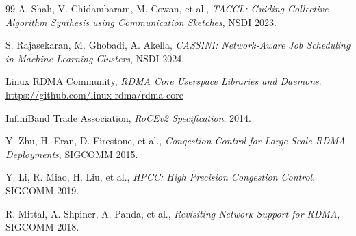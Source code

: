 \documentclass[10pt,letterpaper]{article}
\begin{document}
\begin{thebibliography}{99}
A. Shah, V. Chidambaram, M. Cowan, et al.,
\textit{TACCL: Guiding Collective Algorithm Synthesis using Communication Sketches}, NSDI 2023.

S. Rajasekaran, M. Ghobadi, A. Akella,
\textit{CASSINI: Network-Aware Job Scheduling in Machine Learning Clusters}, NSDI 2024.

Linux RDMA Community,
\textit{RDMA Core Userspace Libraries and Daemons}.
\url{https://github.com/linux-rdma/rdma-core}

InfiniBand Trade Association,
\textit{RoCEv2 Specification}, 2014.

Y. Zhu, H. Eran, D. Firestone, et al.,
\textit{Congestion Control for Large-Scale RDMA Deployments}, SIGCOMM 2015.

Y. Li, R. Miao, H. Liu, et al.,
\textit{HPCC: High Precision Congestion Control}, SIGCOMM 2019.

R. Mittal, A. Shpiner, A. Panda, et al.,
\textit{Revisiting Network Support for RDMA}, SIGCOMM 2018.

\end{thebibliography}
\end{document}
